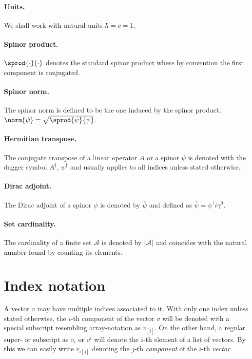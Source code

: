 \paragraph{Units.}
We shall work with natural units $\hbar = c = 1$.

\paragraph{Spinor product.}
$\sprod{\cdot}{\cdot}$ denotes the standard spinor product where by convention the first component is conjugated.

\paragraph{Spinor norm.}
The spinor norm is defined to be the one induced by the spinor product, $\norm{\psi} = \sqrt{\sprod{\psi}{\psi}}$.

\paragraph{Hermitian transpose.}
The conjugate transpose of a linear operator $A$ or a spinor $\psi$ is denoted with the dagger symbol $A^\dagger$, $\psi^\dagger$ and usually applies to all indices unless stated otherwise.

\paragraph{Dirac adjoint.}
The Dirac adjoint of a spinor $\psi$ is denoted by $\bar{\psi}$ and defined as $\bar{\psi} = \psi^\dagger i \gamma^0$.

\paragraph{Set cardinality.}
The cardinality of a finite set $\mathcal{A}$ is denoted by $\lvert \mathcal{A} \rvert$ and coincides with the natural number found by counting its elements.

\section{Index notation}
\label{sec:notation:index}

A vector $v$ may have multiple indices associated to it.
With only one index unless stated otherwise, the $i$-th component of the vector $v$ will be denoted with a special subscript resembling array-notation as $v_{[i]}$.
On the other hand, a regular super- or subscript as $v_i$ or $v^{i}$ will denote the $i$-th element of a list of vectors.
By this we can easily write $v_{i [j]}$ denoting the $j$-th \emph{component} of the $i$-th \emph{vector}.

